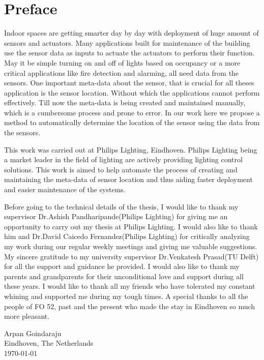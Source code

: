 \chapter*{Preface}


\vspace{1\baselineskip}

\noindent
Indoor spaces are getting smarter day by day with deployment of huge amount of sensors and actuators. Many applications built for maintenance of the building use the sensor data as inputs to actuate the actuators to perform their function. May it be simple turning on and off of lights based on occupancy or a more critical applications like fire detection and alarming, all need data from the sensors. One important meta-data about the sensor, that is crucial for all theses application is the sensor location. Without which the applications cannot perform effectively. Till now the meta-data is being created and maintained manually, which is a cumbersome process and prone to error. In our work here we propose a method to automatically determine the location of the sensor using the data from the sensors.

This work was carried out at Philips Lighting, Eindhoven. Philips Lighting being a market leader in the field of lighting are actively providing lighting control solutions. This work is aimed to help automate the process of creating and maintaining the meta-data of sensor location and thus aiding faster deployment and easier maintenance of the systems.

Before going to the technical details of the thesis, I would like to thank my supervisor Dr.Ashish Pandharipande(Philips Lighting) for giving me an opportunity to carry out my thesis at Philips Lighting. I would also like to thank him and Dr.David Caicedo Fernandez(Philips Lighting) for critically analyzing my work during our regular weekly meetings and giving me valuable suggestions. My sincere gratitude to my university supervisor Dr.Venkatesh Prasad(TU Delft) for all the support and guidance he provided. I would also like to thank my parents and grandparents for their unconditional love and support during all these years.
I would like to thank all my friends who have tolerated my constant whining and supported me during my tough times.
A special thanks to all the people of FO 52, past and the present who made the stay in Eindhoven so much more pleasant.

\vspace{1\baselineskip}

\noindent
Arpan Goindaraju\\
Eindhoven, The Netherlands\\
\today
